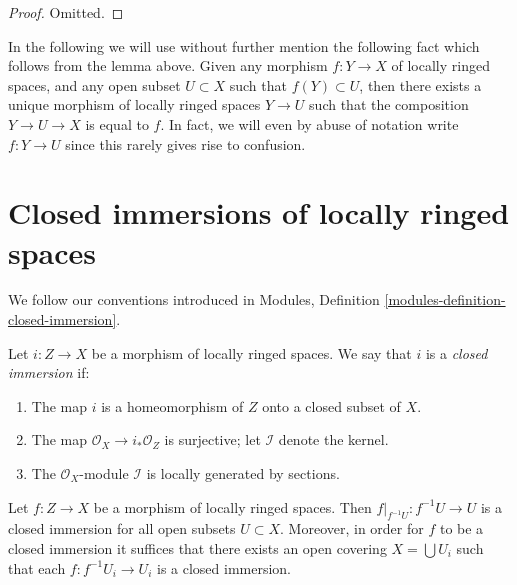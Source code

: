 \begin{proof}
Omitted.
\end{proof}

\noindent
In the following we will use without further mention the following
fact which follows from the lemma above. Given any morphism
$f : Y \to X$ of locally ringed spaces, and any open subset
$U \subset X$ such that $f(Y) \subset U$, then there exists
a unique morphism of locally ringed spaces $Y \to U$ such that
the composition $Y \to U \to X$ is equal to $f$. In fact, we will
even by abuse of notation write $f : Y \to U$ since this rarely
gives rise to confusion.









\section{Closed immersions of locally ringed spaces}
\label{section-closed-immersion}

\noindent
We follow our conventions introduced in
Modules, Definition \ref{modules-definition-closed-immersion}.

\begin{definition}
\label{definition-closed-immersion-locally-ringed-spaces}
Let $i : Z \to X$ be a morphism of locally ringed spaces.
We say that $i$ is a {\it closed immersion} if:
\begin{enumerate}
\item The map $i$ is a homeomorphism of $Z$ onto a closed subset of $X$.
\item The map $\mathcal{O}_X \to i_*\mathcal{O}_Z$ is surjective;
let $\mathcal{I}$ denote the kernel.
\item The $\mathcal{O}_X$-module $\mathcal{I}$
is locally generated by sections.
\end{enumerate}
\end{definition}

\begin{lemma}
\label{lemma-closed-local-target}
Let $f : Z \to X$ be a morphism of locally ringed spaces.
Then $f|_{f^{-1}U}:f^{-1}U\to U$ is a closed immersion
for all open subsets $U\subset X$.
Moreover, in order for $f$ to be a closed immersion it suffices
that there exists an open covering $X = \bigcup U_i$ such
that each $f : f^{-1}U_i \to U_i$ is a closed immersion.
\end{lemma}

